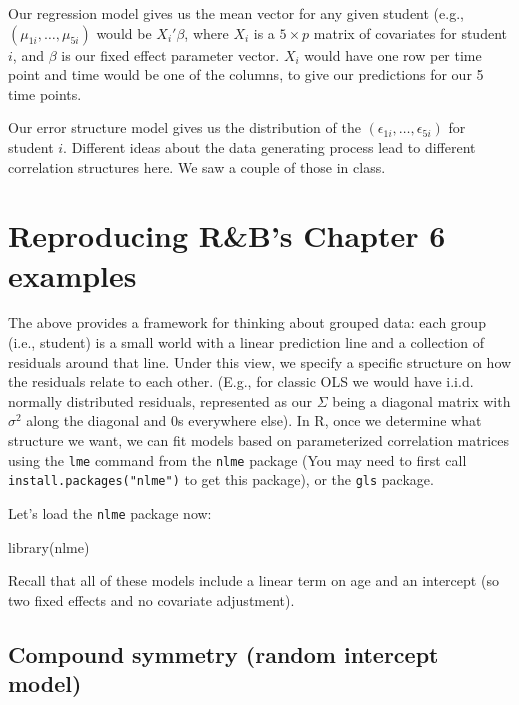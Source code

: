 \documentclass[
  letterpaper,
  DIV=11,
  numbers=noendperiod]{scrreprt}
\newenvironment{Shaded}{}{}
\newcommand{\FunctionTok}[1]{\textcolor[rgb]{0.02,0.16,0.49}{#1}}
\newcommand{\NormalTok}[1]{#1}
\begin{document}
Our regression model gives us the mean vector for any given student
(e.g., \((\mu_{1i}, \ldots, \mu_{5i})\) would be \(X_i'\beta\), where
\(X_i\) is a \(5 \times p\) matrix of covariates for student \(i\), and
\(\beta\) is our fixed effect parameter vector. \(X_i\) would have one
row per time point and time would be one of the columns, to give our
predictions for our 5 time points.

Our error structure model gives us the distribution of the
\((\epsilon_{1i}, \ldots, \epsilon_{5i})\) for student \(i\). Different
ideas about the data generating process lead to different correlation
structures here. We saw a couple of those in class.

\section{Reproducing R\&B's Chapter 6
examples}\label{reproducing-rbs-chapter-6-examples}

The above provides a framework for thinking about grouped data: each
group (i.e., student) is a small world with a linear prediction line and
a collection of residuals around that line. Under this view, we specify
a specific structure on how the residuals relate to each other. (E.g.,
for classic OLS we would have i.i.d. normally distributed residuals,
represented as our \(\Sigma\) being a diagonal matrix with \(\sigma^2\)
along the diagonal and 0s everywhere else). In R, once we determine what
structure we want, we can fit models based on parameterized correlation
matrices using the \texttt{lme} command from the \texttt{nlme} package
(You may need to first call \texttt{install.packages("nlme")} to get
this package), or the \texttt{gls} package.

Let's load the \texttt{nlme} package now:

\begin{Shaded}
\begin{Highlighting}[]
\FunctionTok{library}\NormalTok{(nlme)}
\end{Highlighting}
\end{Shaded}

Recall that all of these models include a linear term on age and an
intercept (so two fixed effects and no covariate adjustment).

\subsection{Compound symmetry (random intercept
model)}\label{compound-symmetry-random-intercept-model}
\end{document}
